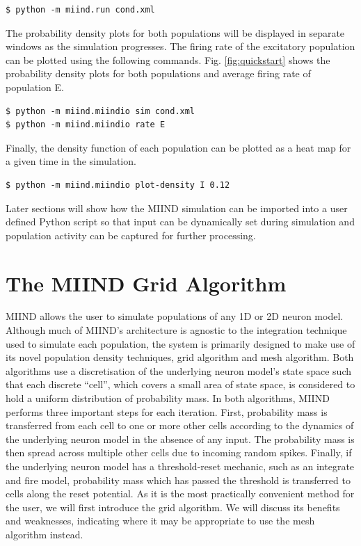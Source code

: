 \documentclass[utf8]{frontiersSCNS} %
\begin{document}
\begin{lstlisting}[caption={Run the cond.xml simulation.}]
$ python -m miind.run cond.xml
\end{lstlisting}

The probability density plots for both populations will be displayed in separate windows as the simulation progresses. The firing rate of the excitatory population can be plotted using the following commands. Fig. \ref{fig:quickstart} shows the probability density plots for both populations and average firing rate of population E.

\begin{lstlisting}[caption={Load the cond.xml simulation and plot the average firing rate of population E.}]
$ python -m miind.miindio sim cond.xml
$ python -m miind.miindio rate E
\end{lstlisting}

Finally, the density function of each population can be plotted as a heat map for a given time in the simulation.

\begin{lstlisting}[caption={Plot the probability density of population I at time 0.12s.}]
$ python -m miind.miindio plot-density I 0.12
\end{lstlisting}

Later sections will show how the MIIND simulation can be imported into a user defined Python script so that input can be dynamically set during simulation and population activity can be captured for further processing. 

\section{The MIIND Grid Algorithm}
\label{gridalgorithm}
MIIND allows the user to simulate populations of any 1D or 2D neuron model. Although much of MIIND’s architecture is agnostic to the integration technique used to simulate each population, the system is primarily designed to make use of its novel population density techniques, grid algorithm and mesh algorithm. Both algorithms use a discretisation of the underlying neuron model's state space such that each discrete ``cell'', which covers a small area of state space, is considered to hold a uniform distribution of probability mass. In both algorithms, MIIND performs three important steps for each iteration. First, probability mass is transferred from each cell to one or more other cells according to the dynamics of the underlying neuron model in the absence of any input. The probability mass is then spread across multiple other cells due to incoming random spikes. Finally, if the underlying neuron model has a threshold-reset mechanic, such as an integrate and fire model, probability mass which has passed the threshold is transferred to cells along the reset potential. As it is the most practically convenient method for the user, we will first introduce the grid algorithm. We will discuss its benefits and weaknesses, indicating where it may be appropriate to use the mesh algorithm instead.
\end{document}
